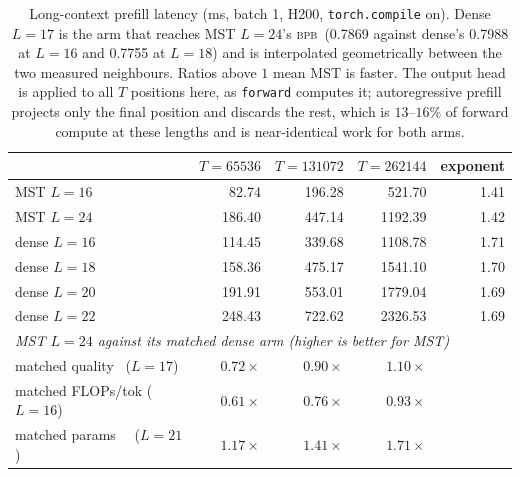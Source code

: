 \documentclass{article}
\newcommand{\bpb}{\textsc{bpb}}
\begin{document}
\begin{table}[t]
\caption{Long-context prefill latency (ms, batch 1, H200, \texttt{torch.compile} on).
Dense $L{=}17$ is the arm that reaches MST $L{=}24$'s \bpb\ (0.7869 against dense's
0.7988 at $L{=}16$ and 0.7755 at $L{=}18$) and is interpolated geometrically between
the two measured neighbours. Ratios above $1$ mean MST is faster. The output head
is applied to all $T$ positions here, as \texttt{forward} computes it; autoregressive
prefill projects only the final position and discards the rest, which is $13$--$16\%$
of forward compute at these lengths and is near-identical work for both arms.}
\label{tab:longctx}
\begin{center}
\begin{small}
\setlength{\tabcolsep}{5pt}
\begin{tabular}{lrrrr}
\toprule
 & $T{=}65536$ & $T{=}131072$ & $T{=}262144$ & exponent \\
\midrule
MST $L{=}16$      &  82.74 &  196.28 &  521.70 & 1.41 \\
MST $L{=}24$      & 186.40 &  447.14 & 1192.39 & 1.42 \\
dense $L{=}16$    & 114.45 &  339.68 & 1108.78 & 1.71 \\
dense $L{=}18$    & 158.36 &  475.17 & 1541.10 & 1.70 \\
dense $L{=}20$    & 191.91 &  553.01 & 1779.04 & 1.69 \\
dense $L{=}22$    & 248.43 &  722.62 & 2326.53 & 1.69 \\
\midrule
\multicolumn{5}{l}{\emph{MST $L{=}24$ against its matched dense arm (higher is better for MST)}} \\
matched quality \ ($L{=}17$)  & $0.72\times$ & $0.90\times$ & $\mathbf{1.10\times}$ & \\
matched FLOPs/tok ($L{=}16$)  & $0.61\times$ & $0.76\times$ & $0.93\times$ & \\
matched params \ \ ($L{=}21$) & $1.17\times$ & $1.41\times$ & $1.71\times$ & \\
\bottomrule
\end{tabular}
\end{small}
\end{center}
\end{table}
\end{document}

